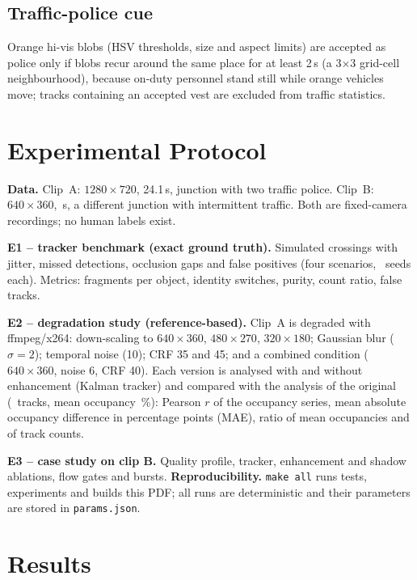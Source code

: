 \documentclass[10pt,twocolumn,a4paper]{article}
\begin{document}
\subsection{Traffic-police cue}
Orange hi-vis blobs (HSV thresholds, size and aspect limits) are accepted as police only if blobs recur around the same place for at least 2\,s (a 3$\times$3 grid-cell neighbourhood), because on-duty personnel stand still while orange vehicles move; tracks containing an accepted vest are excluded from traffic statistics.

\section{Experimental Protocol}
\textbf{Data.} Clip~A: $1280\times720$, 24.1\,s, junction with two traffic police. Clip~B: $640\times360$, \mBDuration\,s, a different junction with intermittent traffic.
Both are fixed-camera recordings; no human labels exist.

\textbf{E1 -- tracker benchmark (exact ground truth).} Simulated crossings with jitter, missed detections, occlusion gaps and false positives (four scenarios, \mBenchSeeds\ seeds each).
Metrics: fragments per object, identity switches, purity, count ratio, false tracks.

\textbf{E2 -- degradation study (reference-based).} Clip~A is degraded with ffmpeg/x264: down-scaling to $640\times360$, $480\times270$, $320\times180$; Gaussian blur ($\sigma=2$); temporal noise (10); CRF 35 and 45; and a combined condition ($640\times360$, noise 6, CRF 40).
Each version is analysed with and without enhancement (Kalman tracker) and compared with the analysis of the original (\mRobRefTracks\ tracks, mean occupancy \mRobRefOcc\,\%):
Pearson $r$ of the occupancy series, mean absolute occupancy difference in percentage points (MAE), ratio of mean occupancies and of track counts.

\textbf{E3 -- case study on clip B.} Quality profile, tracker, enhancement and shadow ablations, flow gates and bursts.
\textbf{Reproducibility.} \texttt{make all} runs tests, experiments and builds this PDF; all runs are deterministic and their parameters are stored in \texttt{params.json}.

\section{Results}
\end{document}
